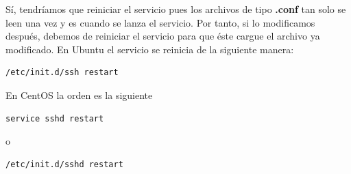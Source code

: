 Sí, tendríamos que reiniciar el servicio pues los archivos de tipo \textbf{.conf} tan solo se leen una vez y es cuando se lanza el servicio. Por tanto, si lo modificamos después, debemos de reiniciar el servicio para que éste cargue el archivo ya modificado. En Ubuntu el servicio se reinicia de la siguiente manera: \begin{verbatim}/etc/init.d/ssh restart\end{verbatim} En CentOS la orden es la siguiente \begin{verbatim}service sshd restart\end{verbatim} o \begin{verbatim}/etc/init.d/sshd restart\end{verbatim}
